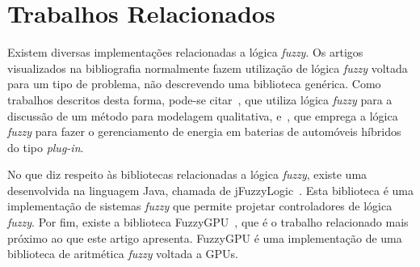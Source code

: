 \documentclass[12pt]{article}
\begin{document}
\section{Trabalhos Relacionados}
\label{sec:trabalhos}

	Existem diversas implementações relacionadas a lógica \textit{fuzzy}. Os artigos visualizados na bibliografia normalmente fazem utilização de lógica \textit{fuzzy} voltada para um tipo de problema, não descrevendo uma biblioteca genérica. Como trabalhos descritos desta forma, pode-se citar~\cite{sugeno:93}, que utiliza lógica \textit{fuzzy} para a discussão de um método para modelagem qualitativa, e~\cite{li:11}, que emprega a lógica \textit{fuzzy} para fazer o gerenciamento de energia em baterias de automóveis híbridos do tipo \textit{plug-in}.
	
	No que diz respeito às bibliotecas relacionadas a lógica \textit{fuzzy}, existe uma desenvolvida na linguagem Java, chamada de jFuzzyLogic~\cite{cingolani:12, cingolani:13}. Esta biblioteca é uma implementação de sistemas \textit{fuzzy} que permite projetar controladores de lógica \textit{fuzzy}. Por fim, existe a biblioteca FuzzyGPU~\cite{defour:14}, que é o trabalho relacionado mais próximo ao que este artigo apresenta. FuzzyGPU é uma implementação de uma biblioteca de aritmética \textit{fuzzy} voltada a GPUs.
	
 	


\end{document}
